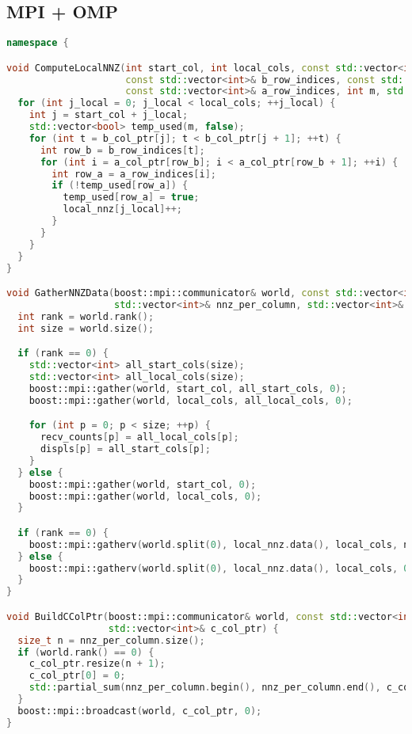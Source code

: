 \documentclass[12pt]{article}
\begin{document}
\subsection*{MPI + OMP}
\begin{lstlisting}[language=C++]
namespace {

void ComputeLocalNNZ(int start_col, int local_cols, const std::vector<int>& b_col_ptr,
                     const std::vector<int>& b_row_indices, const std::vector<int>& a_col_ptr,
                     const std::vector<int>& a_row_indices, int m, std::vector<int>& local_nnz) {
  for (int j_local = 0; j_local < local_cols; ++j_local) {
    int j = start_col + j_local;
    std::vector<bool> temp_used(m, false);
    for (int t = b_col_ptr[j]; t < b_col_ptr[j + 1]; ++t) {
      int row_b = b_row_indices[t];
      for (int i = a_col_ptr[row_b]; i < a_col_ptr[row_b + 1]; ++i) {
        int row_a = a_row_indices[i];
        if (!temp_used[row_a]) {
          temp_used[row_a] = true;
          local_nnz[j_local]++;
        }
      }
    }
  }
}

void GatherNNZData(boost::mpi::communicator& world, const std::vector<int>& local_nnz, int local_cols, int start_col,
                   std::vector<int>& nnz_per_column, std::vector<int>& recv_counts, std::vector<int>& displs) {
  int rank = world.rank();
  int size = world.size();

  if (rank == 0) {
    std::vector<int> all_start_cols(size);
    std::vector<int> all_local_cols(size);
    boost::mpi::gather(world, start_col, all_start_cols, 0);
    boost::mpi::gather(world, local_cols, all_local_cols, 0);

    for (int p = 0; p < size; ++p) {
      recv_counts[p] = all_local_cols[p];
      displs[p] = all_start_cols[p];
    }
  } else {
    boost::mpi::gather(world, start_col, 0);
    boost::mpi::gather(world, local_cols, 0);
  }

  if (rank == 0) {
    boost::mpi::gatherv(world.split(0), local_nnz.data(), local_cols, nnz_per_column.data(), recv_counts, displs, 0);
  } else {
    boost::mpi::gatherv(world.split(0), local_nnz.data(), local_cols, 0);
  }
}

void BuildCColPtr(boost::mpi::communicator& world, const std::vector<int>& nnz_per_column,
                  std::vector<int>& c_col_ptr) {
  size_t n = nnz_per_column.size();
  if (world.rank() == 0) {
    c_col_ptr.resize(n + 1);
    c_col_ptr[0] = 0;
    std::partial_sum(nnz_per_column.begin(), nnz_per_column.end(), c_col_ptr.begin() + 1);
  }
  boost::mpi::broadcast(world, c_col_ptr, 0);
}


\end{lstlisting}
\end{document}
